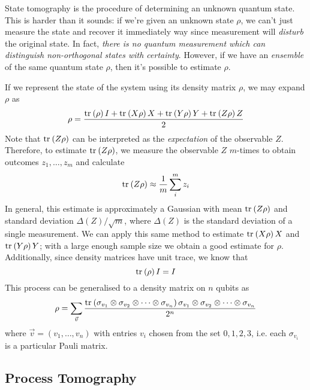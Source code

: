 State tomography is the procedure of determining an unknown quantum state. This is harder than it
sounds: if we're given an unknown state $\rho$, we can't just measure the state and recover it
immediately way since measurement will \textit{disturb} the original state. In fact, \textit{there
is no quantum measurement which can distinguish non-orthogonal states with certainty}. However, if
we have an \textit{ensemble} of the same quantum state $\rho$, then it's possible to estimate
$\rho$.

If we represent the state of the system using its density matrix $\rho$, we may expand $\rho$ as
\begin{equation}
    \rho = \frac{\text{tr}_{}\left(\rho\right)I + \text{tr}_{}\left(X\rho\right)X + \text{tr}_{}\left(Y\rho\right)Y + \text{tr}_{}\left(Z\rho\right)Z}
                {2}
\end{equation}
Note that $\text{tr}_{}\left(Z\rho\right)$ can be interpreted as the \textit{expectation} of the observable $Z$.
Therefore, to estimate $\text{tr}_{}\left(Z\rho\right)$, we measure the observable $Z$ $m$-times to obtain outcomes
$z_1, \dots, z_m$ and calculate
\begin{equation}
    \text{tr}_{}\left(Z\rho\right) \approx \frac{1}{m} \sum_i^m z_i
\end{equation}
In general, this estimate is approximately a Gaussian with mean $\text{tr}_{}\left(Z\rho\right)$ and standard deviation
$\Delta(Z) / \sqrt{m}$, where $\Delta(Z)$ is the standard deviation of a single measurement. We can
apply this same method to estimate $\text{tr}_{}\left(X\rho\right)X$ and $\text{tr}_{}\left(Y\rho\right)Y$; with a large enough sample size
we obtain a good estimate for $\rho$. Additionally, since density matrices have unit trace, we know
that
\begin{equation}
    \text{tr}_{}\left(\rho\right) I = I
\end{equation}
This process can be generalised to a density matrix on $n$ qubits as
\begin{equation}
    \rho = \sum_{\vec{v}} \frac{\text{tr}_{}\left(\sigma_{v_1} \otimes \sigma_{v_2} \otimes \dots \otimes \sigma_{v_n}\right) \sigma_{v_1} \otimes \sigma_{v_2} \otimes \dots \otimes \sigma_{v_n}}{2^n}
\end{equation}
where $\vec{v} = \left(v_1, \dots, v_n\right)$ with entries $v_i$ chosen from the set $0, 1, 2, 3$,
i.e. each $\sigma_{v_i}$ is a particular Pauli matrix.


\subsection{Process Tomography}

